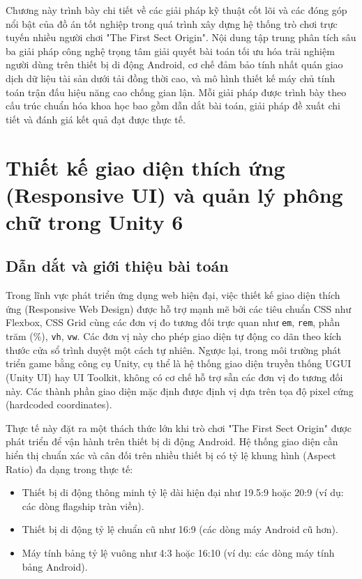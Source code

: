 \documentclass[../Project.tex]{subfiles}
\begin{document}
Chương này trình bày chi tiết về các giải pháp kỹ thuật cốt lõi và các đóng góp nổi bật của đồ án tốt nghiệp trong quá trình xây dựng hệ thống trò chơi trực tuyến nhiều người chơi "The First Sect Origin". Nội dung tập trung phân tích sâu ba giải pháp công nghệ trọng tâm giải quyết bài toán tối ưu hóa trải nghiệm người dùng trên thiết bị di động Android, cơ chế đảm bảo tính nhất quán giao dịch dữ liệu tài sản dưới tải đồng thời cao, và mô hình thiết kế máy chủ tính toán trận đấu hiệu năng cao chống gian lận. Mỗi giải pháp được trình bày theo cấu trúc chuẩn hóa khoa học bao gồm dẫn dắt bài toán, giải pháp đề xuất chi tiết và đánh giá kết quả đạt được thực tế.

\section{Thiết kế giao diện thích ứng (Responsive UI) và quản lý phông chữ trong Unity 6}
\label{sec:sol_responsive_ui}

\subsection{Dẫn dắt và giới thiệu bài toán}
Trong lĩnh vực phát triển ứng dụng web hiện đại, việc thiết kế giao diện thích ứng (Responsive Web Design) được hỗ trợ mạnh mẽ bởi các tiêu chuẩn CSS như Flexbox, CSS Grid cùng các đơn vị đo tương đối trực quan như \texttt{em}, \texttt{rem}, phần trăm (\%), \texttt{vh}, \texttt{vw}. Các đơn vị này cho phép giao diện tự động co dãn theo kích thước cửa sổ trình duyệt một cách tự nhiên. Ngược lại, trong môi trường phát triển game bằng công cụ Unity, cụ thể là hệ thống giao diện truyền thống UGUI (Unity UI) hay UI Toolkit, không có cơ chế hỗ trợ sẵn các đơn vị đo tương đối này. Các thành phần giao diện mặc định được định vị dựa trên tọa độ pixel cứng (hardcoded coordinates).

Thực tế này đặt ra một thách thức lớn khi trò chơi "The First Sect Origin" được phát triển để vận hành trên thiết bị di động Android. Hệ thống giao diện cần hiển thị chuẩn xác và cân đối trên nhiều thiết bị có tỷ lệ khung hình (Aspect Ratio) đa dạng trong thực tế:
\begin{itemize}
    \item Thiết bị di động thông minh tỷ lệ dài hiện đại như 19.5:9 hoặc 20:9 (ví dụ: các dòng flagship tràn viền).
    \item Thiết bị di động tỷ lệ chuẩn cũ như 16:9 (các dòng máy Android cũ hơn).
    \item Máy tính bảng tỷ lệ vuông như 4:3 hoặc 16:10 (ví dụ: các dòng máy tính bảng Android).
\end{itemize}
\end{document}
